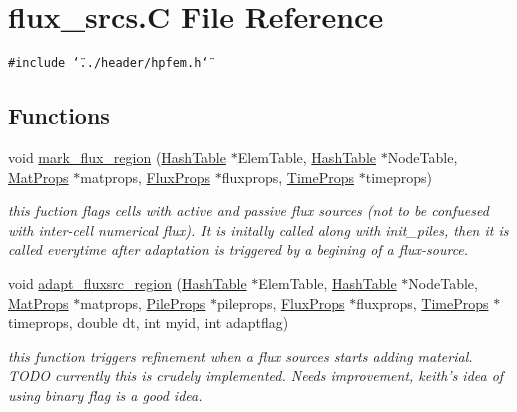 \hypertarget{flux__srcs_8C}{
\section{flux\_\-srcs.C File Reference}
\label{flux__srcs_8C}
}
{\tt \#include \char`\"{}../header/hpfem.h\char`\"{}}\par
\subsection*{Functions}
\begin{CompactItemize}
\item 
void \hyperlink{flux__srcs_8C_a0}{mark\_\-flux\_\-region} (\hyperlink{classHashTable}{Hash\-Table} $\ast$Elem\-Table, \hyperlink{classHashTable}{Hash\-Table} $\ast$Node\-Table, \hyperlink{structMatProps}{Mat\-Props} $\ast$matprops, \hyperlink{structFluxProps}{Flux\-Props} $\ast$fluxprops, \hyperlink{structTimeProps}{Time\-Props} $\ast$timeprops)
\begin{CompactList}\small\item\em this fuction flags cells with active and passive flux sources (not to be confuesed with inter-cell numerical flux). It is initally called along with init\_\-piles, then it is called everytime after adaptation is triggered by a begining of a flux-source. \item\end{CompactList}\item 
void \hyperlink{flux__srcs_8C_a1}{adapt\_\-fluxsrc\_\-region} (\hyperlink{classHashTable}{Hash\-Table} $\ast$Elem\-Table, \hyperlink{classHashTable}{Hash\-Table} $\ast$Node\-Table, \hyperlink{structMatProps}{Mat\-Props} $\ast$matprops, \hyperlink{structPileProps}{Pile\-Props} $\ast$pileprops, \hyperlink{structFluxProps}{Flux\-Props} $\ast$fluxprops, \hyperlink{structTimeProps}{Time\-Props} $\ast$timeprops, double dt, int myid, int adaptflag)
\begin{CompactList}\small\item\em this function triggers refinement when a flux sources starts adding material. TODO currently this is crudely implemented. Needs improvement, keith's idea of using binary flag is a good idea. \item\end{CompactList}\end{CompactItemize}


